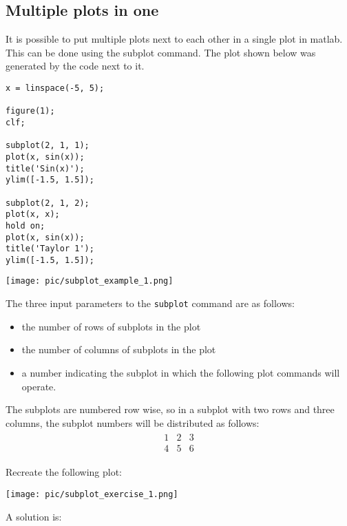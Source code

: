 \pagebreak[4]
\subsection{Multiple plots in one}
\label{ssecMultiplePlotsInOne}

It is possible to put multiple plots 
next to each other in a single plot in matlab.
This can be done using the subplot command.
The plot shown below
was generated by the code next to it.
\begin{multicols}{2}
\begin{lstlisting}
x = linspace(-5, 5);

figure(1);
clf;

subplot(2, 1, 1);
plot(x, sin(x));
title('Sin(x)');
ylim([-1.5, 1.5]);

subplot(2, 1, 2);
plot(x, x);
hold on;
plot(x, sin(x));
title('Taylor 1');
ylim([-1.5, 1.5]);
\end{lstlisting}
\columnbreak
\texttt{[image: pic/subplot\_example\_1.png]}
\end{multicols}

The three input parameters to the \verb!subplot! command
are as follows: 
\begin{itemize}
\item		the number of rows of subplots in the plot
\item		the number of columns of subplots in the plot
\item		a number indicating the subplot in which the following plot commands will operate.
\end{itemize}
The subplots are numbered row wise, so in a subplot 
with two rows and three columns, the subplot numbers will be
distributed as follows:
\begin{align*}
\begin{matrix}
1 & 2 & 3 \\
4 & 5 & 6
\end{matrix}
\end{align*}




\begin{ex}
Recreate the following plot: 
\begin{center}
\texttt{[image: pic/subplot\_exercise\_1.png]}
\end{center}
\begin{hint}
\end{hint}
\begin{sol}
A solution is:
\begin{lstlisting}
\end{lstlisting}
\end{sol}
\end{ex}
 